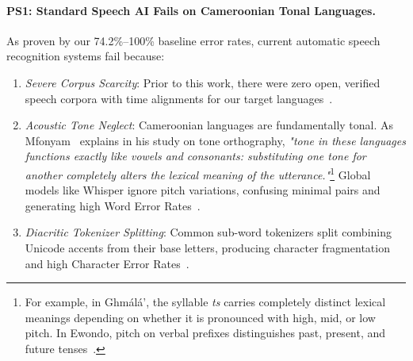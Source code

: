\documentclass[a4paper,11pt]{article}
\begin{document}
\paragraph{\textbf{PS1: Standard Speech AI Fails on Cameroonian Tonal Languages.}}
As proven by our 74.2\%--100\% baseline error rates, current automatic speech recognition systems fail because:
\begin{enumerate}
    \item \textit{Severe Corpus Scarcity}: Prior to this work, there were zero open, verified speech corpora with time alignments for our target languages~\cite{hedren2022challenges}.
    \item \textit{Acoustic Tone Neglect}: Cameroonian languages are fundamentally tonal. As Mfonyam~\cite{mfonyam1994tone} explains in his study on tone orthography, \textit{"tone in these languages functions exactly like vowels and consonants: substituting one tone for another completely alters the lexical meaning of the utterance."}\footnote{For example, in Gh\textopeno m\'al\'a', the syllable \textit{ts}\textopeno{} carries completely distinct lexical meanings depending on whether it is pronounced with high, mid, or low pitch. In Ewondo, pitch on verbal prefixes distinguishes past, present, and future tenses~\cite{essono2010ewondo}.} Global models like Whisper ignore pitch variations, confusing minimal pairs and generating high Word Error Rates~\cite{nahabwe2026benchmarking}.
    \item \textit{Diacritic Tokenizer Splitting}: Common sub-word tokenizers split combining Unicode accents from their base letters, producing character fragmentation and high Character Error Rates~\cite{joshi2020state}.
\end{enumerate}
\end{document}
